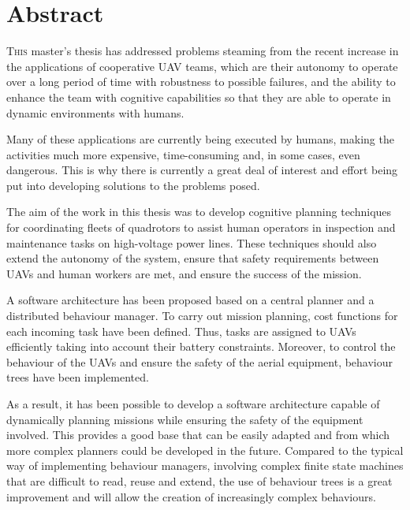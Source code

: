 \chapter*{Abstract}
\pagestyle{especial}
{}

\lettrine[lraise=-0.1, lines=2, loversize=0.2]{T}{his} master's thesis has addressed problems steaming from the recent increase in the applications of cooperative \gls{UAV} teams, which are their autonomy to operate over a long period of time with robustness to possible failures, and the ability to enhance the team with cognitive capabilities so that they are able to operate in dynamic environments with humans.

Many of these applications are currently being executed by humans, making the activities much more expensive, time-consuming and, in some cases, even dangerous. This is why there is currently a great deal of interest and effort being put into developing solutions to the problems posed. 

The aim of the work in this thesis was to develop cognitive planning techniques for coordinating fleets of quadrotors to assist human operators in inspection and maintenance tasks on high-voltage power lines. These techniques should also extend the autonomy of the system, ensure that safety requirements between UAVs and human workers are met, and ensure the success of the mission.

A software architecture has been proposed based on a central planner and a distributed behaviour manager. To carry out mission planning, cost functions for each incoming task have been defined. Thus, tasks are assigned to UAVs efficiently taking into account their battery constraints. Moreover, to control the behaviour of the UAVs and ensure the safety of the aerial equipment, behaviour trees have been implemented.

As a result, it has been possible to develop a software architecture capable of dynamically planning missions while ensuring the safety of the equipment involved. This provides a good base that can be easily adapted and from which more complex planners could be developed in the future. Compared to the typical way of implementing behaviour managers, involving complex finite state machines that are difficult to read, reuse and extend, the use of behaviour trees is a great improvement and will allow the creation of increasingly complex behaviours.

